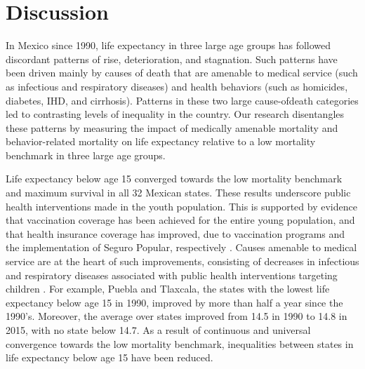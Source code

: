 \documentclass{bmcart}
\begin{document}
\section*{Discussion}
In Mexico since 1990, life expectancy in three large age groups has followed discordant patterns of rise, deterioration, and stagnation. Such patterns have been driven mainly by causes of death that are amenable to medical service (such as infectious and respiratory diseases) and health behaviors (such as homicides, diabetes, IHD, and cirrhosis). Patterns in these two large cause-ofdeath categories led to contrasting levels of inequality in the country. Our research disentangles these patterns by measuring the impact of medically amenable mortality and behavior-related mortality on life expectancy relative to a low mortality benchmark in three large age groups. %

Life expectancy below age 15 converged towards the low mortality benchmark and maximum survival in all 32 Mexican states. These results underscore public health interventions made in the youth population. This is supported by evidence that vaccination coverage has been achieved for the entire young population, and that health insurance coverage has improved, due to vaccination programs and the implementation of Seguro Popular, respectively \cite{urquieta2015evolution}. Causes amenable to medical service are at the heart of such improvements, consisting of decreases in infectious and respiratory diseases associated with public health interventions targeting children \cite{sepulveda2006}. For example, Puebla and Tlaxcala, the states with the lowest life expectancy below age 15 in 1990, improved by more than half a year since the 1990's. Moreover, the average over states improved from 14.5 in 1990 to 14.8 in 2015, with no state below 14.7. As a result of continuous and universal convergence towards the low mortality benchmark, inequalities between states in life expectancy below age 15 have been reduced. 
\end{document}
